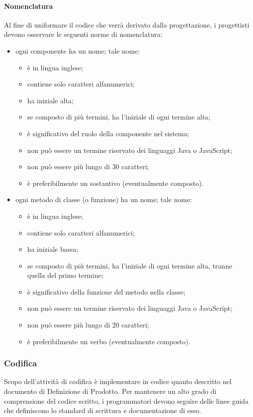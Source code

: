 	\paragraph{Nomenclatura} Al fine di uniformare il codice che verrà derivato dalla progettazione, i progettisti devono osservare le seguenti norme di nomenclatura:
	\begin{itemize}
		\item ogni componente ha un nome; tale nome:
		\begin{itemize}
			\item è in lingua inglese;
			\item contiene solo caratteri alfanumerici;
			\item ha iniziale alta;
			\item se composto di più termini, ha l'iniziale di ogni termine alta;
			\item è significativo del ruolo della componente nel sistema;
			\item non può essere un termine riservato dei linguaggi Java o JavaScript;
			\item non può essere più lungo di 30 caratteri;
			\item è preferibilmente un sostantivo (eventualmente composto).
		\end{itemize}
		\item ogni metodo di classe (o funzione) ha un nome; tale nome:
		\begin{itemize}
			\item è in lingua inglese;
			\item contiene solo caratteri alfanumerici;
			\item ha iniziale bassa;
			\item se composto di più termini, ha l'iniziale di ogni termine alta, tranne quella del primo termine;
			\item è significativo della funzione del metodo nella classe;
			\item non può essere un termine riservato dei linguaggi Java o JavaScript;
			\item non può essere più lungo di 20 caratteri;
			\item è preferibilmente un verbo (eventualmente composto).
		\end{itemize}
	\end{itemize}

	\subsubsection{Codifica} \label{sec:cod}
	Scopo dell'attività di codifica è implementare in codice quanto descritto nel documento di Definizione di Prodotto. Per mantenere un alto grado di comprensione del codice scritto, i programmatori devono seguire delle linee guida che definiscono lo standard di scrittura e documentazione di esso.

